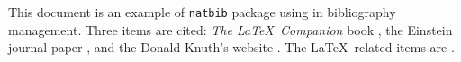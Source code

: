\documentclass{my_class}
\begin{document}
    
This document is an example of \texttt{natbib} package using in bibliography
management. Three items are cited: \textit{The \LaTeX\ Companion} book 
\cite{latexcompanion}, the Einstein journal paper \cite{einstein}, and the 
Donald Knuth's website \cite{knuthwebsite}. The \LaTeX\ related items are 
\cite{latexcompanion,knuthwebsite}. 

\medskip

% 

\end{document}
